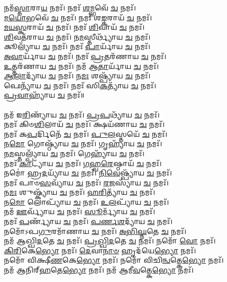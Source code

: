 𑌨𑌮᳴\-\ul{𑌸𑍍𑌤𑌾}\-𑌰𑌾\-\ul{𑌯} 𑌨𑌮𑌃᳴। 𑌨𑌮𑌃᳴ \ul{𑌶}\-𑌮𑍍𑌭𑌵𑍇᳴ \ul{𑌚} 𑌨𑌮𑌃᳴। \\
\-\ul{𑌮}\-\-\ul{𑌯𑍋}\-𑌭𑌵𑍇᳴ \ul{𑌚} 𑌨𑌮𑌃᳴। 𑌨𑌮𑌃᳴ 𑌶\-\ul{𑌙𑍍𑌕}\-𑌰𑌾𑌯᳴ \ul{𑌚} 𑌨𑌮𑌃᳴। \\
\-\ul{𑌮}\-\-\ul{𑌯}\-\-\ul{𑌸𑍍𑌕}\-𑌰𑌾𑌯᳴ \ul{𑌚} 𑌨𑌮𑌃᳴। 𑌨𑌮𑌃᳴ \ul{𑌶𑌿}\-𑌵𑌾𑌯᳴  \ul{𑌚} 𑌨𑌮𑌃᳴। \\
\-\ul{𑌶𑌿}\-𑌵𑌤᳴𑌰𑌾𑌯 \ul{𑌚} 𑌨𑌮𑌃᳴। 𑌨\-\ul{𑌮}\-𑌸𑍍𑌤𑍀𑌰𑍍𑌥𑍍𑌯𑌾᳴𑌯 \ul{𑌚} 𑌨𑌮𑌃᳴। \\
𑌕𑍂𑌲𑍍𑌯𑌾᳴𑌯 \ul{𑌚} 𑌨𑌮𑌃᳴। 𑌨𑌮𑌃᳴ \ul{𑌪𑌾}\-𑌰𑍍𑌯𑌾᳴𑌯 \ul{𑌚} 𑌨𑌮𑌃᳴। \\
\-\ul{𑌅}\-\-\ul{𑌵𑌾}\-𑌰𑍍𑌯𑌾᳴𑌯 \ul{𑌚} 𑌨𑌮𑌃᳴। 𑌨𑌮𑌃᳴ \ul{𑌪𑍍𑌰}\-𑌤𑌰᳴𑌣𑌾𑌯 \ul{𑌚} 𑌨𑌮𑌃᳴। \\
\-\ul{𑌉}\-𑌤𑍍𑌤𑌰᳴𑌣𑌾𑌯 \ul{𑌚} 𑌨𑌮𑌃᳴। 𑌨𑌮᳴ 𑌆\-\ul{𑌤𑌾}\-𑌰𑍍𑌯𑌾᳴𑌯 \ul{𑌚} 𑌨𑌮𑌃᳴। \\
\-\ul{𑌆}\-\-\ul{𑌲𑌾}\-𑌦𑍍𑌯𑌾᳴𑌯 \ul{𑌚} 𑌨𑌮𑌃᳴। 𑌨\-\ul{𑌮𑌃} 𑌶𑌷𑍍𑌪𑍍𑌯𑌾᳴𑌯 \ul{𑌚} 𑌨𑌮𑌃᳴। \\
𑌫𑍇𑌨𑍍𑌯𑌾᳴𑌯 \ul{𑌚} 𑌨𑌮𑌃᳴। 𑌨𑌮𑌃᳴ 𑌸𑌿\-\ul{𑌕}\-𑌤𑍍𑌯𑌾᳴𑌯 \ul{𑌚} 𑌨𑌮𑌃᳴। \\
\-\ul{𑌪𑍍𑌰}\-\-\ul{𑌵𑌾}\-𑌹𑍍𑌯𑌾᳴𑌯 \ul{𑌚} 𑌨𑌮𑌃᳴॥ \\
\\
𑌨𑌮᳴ 𑌇\-\ul{𑌰𑌿}\-𑌣𑍍𑌯𑌾᳴𑌯 \ul{𑌚} 𑌨𑌮𑌃᳴। \ul{𑌪𑍍𑌰}\-\-\ul{𑌪}\-𑌥𑍍𑌯𑌾᳴𑌯 \ul{𑌚} 𑌨𑌮𑌃᳴। \\
𑌨𑌮𑌃᳴ 𑌕𑌿𑍞\-\ul{𑌶𑌿}\-𑌲𑌾𑌯᳴ \ul{𑌚} 𑌨𑌮𑌃᳴। 𑌕𑍍𑌷𑌯᳴𑌣𑌾𑌯 \ul{𑌚} 𑌨𑌮𑌃᳴। \\
𑌨𑌮𑌃᳴ 𑌕\-\ul{𑌪}\-𑌰𑍍𑌦𑌿𑌨𑍇᳴ \ul{𑌚} 𑌨𑌮𑌃᳴। \ul{𑌪𑍁}\-\-\ul{𑌲}\-𑌸𑍍𑌤𑌯𑍇᳴ \ul{𑌚} 𑌨𑌮𑌃᳴।\\
𑌨\-\ul{𑌮𑍋} 𑌗𑍋𑌷𑍍𑌠𑍍𑌯𑌾᳴𑌯 \ul{𑌚} 𑌨𑌮𑌃᳴। 𑌗𑍃𑌹𑍍𑌯𑌾᳴𑌯 \ul{𑌚} 𑌨𑌮𑌃᳴। \\
𑌨\-\ul{𑌮}\-𑌸𑍍𑌤𑌲𑍍𑌪𑍍𑌯𑌾᳴𑌯 \ul{𑌚} 𑌨𑌮𑌃᳴। 𑌗𑍇𑌹𑍍𑌯𑌾᳴𑌯 \ul{𑌚} 𑌨𑌮𑌃᳴। \\
𑌨𑌮𑌃᳴ \ul{𑌕𑌾}\-𑌟𑍍𑌯𑌾᳴𑌯 \ul{𑌚} 𑌨𑌮𑌃᳴। \ul{𑌗}\-\-\ul{𑌹𑍍𑌵}\-\-\ul{𑌰𑍇}\-𑌷𑍍𑌠𑌾𑌯᳴ \ul{𑌚} 𑌨𑌮𑌃᳴।\\
𑌨𑌮𑍋॑ 𑌹𑍍𑌰\-\ul{𑌦}\-𑌯𑍍𑌯𑌾᳴𑌯 \ul{𑌚} 𑌨𑌮𑌃᳴। \ul{𑌨𑌿}\-\-\ul{𑌵𑍇}\-𑌷𑍍𑌪𑍍𑌯𑌾᳴𑌯 \ul{𑌚} 𑌨𑌮𑌃᳴। \\
𑌨𑌮𑌃᳴ 𑌪𑌾𑍞\-\ul{𑌸}\-𑌵𑍍𑌯𑌾᳴𑌯 \ul{𑌚} 𑌨𑌮𑌃᳴। \ul{𑌰}\-\-\ul{𑌜}\-𑌸𑍍𑌯𑌾᳴𑌯 \ul{𑌚} 𑌨𑌮𑌃᳴।\\
𑌨\-\ul{𑌮𑌃} 𑌶𑍁𑌷𑍍𑌕𑍍𑌯𑌾᳴𑌯 \ul{𑌚} 𑌨𑌮𑌃᳴। \ul{𑌹}\-\-\ul{𑌰𑌿}\-𑌤𑍍𑌯𑌾᳴𑌯 \ul{𑌚} 𑌨𑌮𑌃᳴। \\
𑌨\-\ul{𑌮𑍋} 𑌲𑍋𑌪𑍍𑌯𑌾᳴𑌯 \ul{𑌚} 𑌨𑌮𑌃᳴। \ul{𑌉}\-\-\ul{𑌲}\-𑌪𑍍𑌯𑌾᳴𑌯 \ul{𑌚} 𑌨𑌮𑌃᳴। \\
𑌨𑌮᳴ \ul{𑌊}\-𑌰𑍍𑌵𑍍𑌯𑌾᳴𑌯 \ul{𑌚} 𑌨𑌮𑌃᳴। \ul{𑌸𑍂}\-𑌰𑍍𑌮𑍍𑌯𑌾᳴𑌯 \ul{𑌚} 𑌨𑌮𑌃᳴। \\
𑌨𑌮𑌃᳴ \ul{𑌪}\-𑌰𑍍𑌣𑍍𑌯𑌾᳴𑌯 \ul{𑌚} 𑌨𑌮𑌃᳴। \ul{𑌪}\-\-\ul{𑌰𑍍𑌣}\-\-\ul{𑌶}\-𑌦𑍍𑌯𑌾᳴𑌯 \ul{𑌚} 𑌨𑌮𑌃᳴। \\
𑌨𑌮𑍋᳴𑌽𑌪\-\ul{𑌗𑍁}\-𑌰𑌮𑌾᳴𑌣𑌾𑌯 \ul{𑌚} 𑌨𑌮𑌃᳴। \ul{𑌅}\-\-\ul{𑌭𑌿}\-\-\ul{𑌘𑍍𑌨}\-𑌤𑍇 \ul{𑌚} 𑌨𑌮𑌃᳴। \\
𑌨𑌮᳴ 𑌆𑌖𑍍𑌖𑌿\-\ul{𑌦}\-𑌤𑍇 \ul{𑌚} 𑌨𑌮𑌃᳴। \ul{𑌪𑍍𑌰}\-\-\ul{𑌖𑍍𑌖𑌿}\-\-\ul{𑌦}\-𑌤𑍇 \ul{𑌚} 𑌨𑌮𑌃᳴। 𑌨𑌮𑍋᳴ \ul{𑌵𑍋} 𑌨𑌮𑌃᳴। \\
\-\ul{𑌕𑌿}\-\-\ul{𑌰𑌿}\-𑌕𑍇\-\ul{𑌭𑍍𑌯𑍋} 𑌨𑌮𑌃᳴। \ul{𑌦𑍇}\-𑌵𑌾\-\ul{𑌨𑌾}\-\-\ul{𑍞} 𑌹𑍃𑌦᳴𑌯𑍇\-\ul{𑌭𑍍𑌯𑍋} 𑌨𑌮𑌃᳴। \\
𑌨𑌮𑍋᳴ 𑌵𑌿𑌕𑍍𑌷𑍀\-\ul{𑌣}\-𑌕𑍇\-\ul{𑌭𑍍𑌯𑍋} 𑌨𑌮𑌃᳴। 𑌨𑌮𑍋᳴ 𑌵𑌿𑌚𑌿\-\ul{𑌨𑍍𑌵}\-𑌤𑍍𑌕𑍇\-\ul{𑌭𑍍𑌯𑍋} 𑌨𑌮𑌃᳴। \\
𑌨𑌮᳴ 𑌆𑌨𑌿𑌰𑍍‌\-\ul{𑌹}\-𑌤𑍇\-\ul{𑌭𑍍𑌯𑍋} 𑌨𑌮𑌃᳴। 𑌨𑌮᳴ 𑌆𑌮𑍀\-\ul{𑌵}\-𑌤𑍍𑌕𑍇\-\ul{𑌭𑍍𑌯𑍋} 𑌨𑌮𑌃᳴। \\
{\small \closesection}


